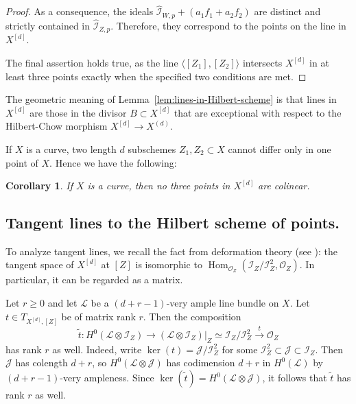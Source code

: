 \documentclass[a4paper]{amsart}
\numberwithin{equation}{section}
\theoremstyle{plain}
\newtheorem{cor}[thm]{Corollary}
\theoremstyle{definition}
\theoremstyle{remark}
\numberwithin{figure}{section}
\numberwithin{table}{section}
\numberwithin{equation}{section}
\def \Ical {\mathcal{I}}
\def \Jcal {\mathcal{J}}
\def \Lcal {\mathcal{L}}
\def \Ocal {\mathcal{O}}
\DeclareMathOperator{\Hom}{Hom}
\begin{document}
\begin{proof}
    As a consequence, the ideals $\hat{\Ical}_{W,p} + (a_1f_1+a_2f_2)$ are distinct and strictly contained in $\hat{\Ical}_{Z,p}$.
    Therefore, they correspond to the points on the line in $X^{[d]}$.

    The final assertion holds true, as the line $\langle [Z_1],[Z_2] \rangle$ intersects $X^{[d]}$ in at least three points exactly when the specified two conditions are met.
\end{proof}

The geometric meaning of Lemma~\ref{lem:lines-in-Hilbert-scheme} is that lines in $X^{[d]}$ are those in the divisor $B \subset X^{[d]}$ that are exceptional with respect to the Hilbert-Chow morphism $X^{[d]} \rightarrow X^{(d)}$.

If $X$ is a curve, two length $d$ subschemes $Z_1, Z_2 \subset X$ cannot differ only in one point of $X$.
Hence we have the following:

\begin{cor} \label{cor:No-lines-for-curve}
    If $X$ is a curve, then no three points in $X^{[d]}$ are colinear.
\end{cor}


\subsection{Tangent lines to the Hilbert scheme of points.} \label{subsec:tangent-lines}


To analyze tangent lines, we recall the fact from deformation theory (see \cite[Theorem~3.2]{Lehn2004}): the tangent space of $X^{[d]}$ at $[Z]$ is isomorphic to $\Hom_{\Ocal_Z}(\Ical_Z/\Ical_Z^2, \Ocal_Z)$.
In particular, it can be regarded as a matrix.

Let $r \geq 0$ and let $\Lcal$ be a $(d+r-1)$-very ample line bundle on $X$.
Let $t \in T_{X^{[d]},[Z]}$ be of matrix rank $r$.
Then the composition
 \[
  \widetilde{t}:H^0(\Lcal \otimes \Ical_Z) \rightarrow (\Lcal \otimes \Ical_Z)|_Z \simeq \Ical_Z/\Ical_Z^2 \xrightarrow{t} \Ocal_Z
 \]
has rank $r$ as well.
Indeed, write $\ker(t) = \Jcal/\Ical_Z^2$ for some $\Ical_Z^2 \subset \Jcal \subset \Ical_Z$.
Then $\Jcal$ has colength $d+r$, so $H^0(\Lcal \otimes \Jcal)$ has codimension $d+r$ in $H^0(\Lcal)$ by $(d+r-1)$-very ampleness.
Since $\ker(\widetilde{t}) = H^0(\Lcal \otimes \Jcal)$, it follows that $\widetilde{t}$ has rank $r$ as well.
\end{document}
